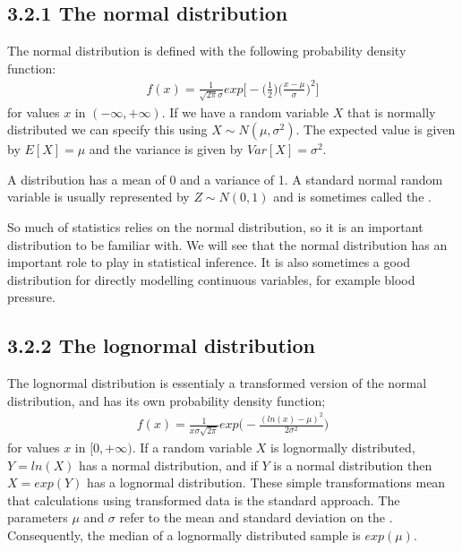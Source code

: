 \documentclass[letterpaper,10pt,english]{jupyterBook}
\begin{document}
\subsection{3.2.1 The normal distribution}
\label{\detokenize{03.c. Continuous Probability Distributions:the-normal-distribution}}
\sphinxAtStartPar
The normal distribution is defined with the following probability density function:
\begin{equation*}
\begin{split}
f(x) = \frac{1}{\sqrt{2\pi}\sigma}exp \Big[-\Big(\frac{1}{2}\Big)\Big(\frac{x-\mu}{\sigma}\Big)^2\Big]
\end{split}
\end{equation*}
\sphinxAtStartPar
for values \(x\) in \((-\infty, +\infty)\). If we have a random variable \(X\) that is normally distributed we can specify this using \(X {\sim} N(\mu, \sigma^2)\). The expected value is given by \(E[X]=\mu\) and the variance is given by \(Var[X] = \sigma^2\).

\sphinxAtStartPar
A  distribution has a mean of 0 and a variance of 1. A standard normal random variable is usually represented by \(Z {\sim} N(0,1)\) and is sometimes called the .

\sphinxAtStartPar
So much of statistics relies on the normal distribution, so it is an important distribution to be familiar with. We will see that the normal distribution has an important role to play in statistical inference. It is also sometimes a good distribution for directly modelling continuous variables, for example blood pressure.


\subsection{3.2.2 The log\sphinxhyphen{}normal distribution}
\label{\detokenize{03.c. Continuous Probability Distributions:the-log-normal-distribution}}
\sphinxAtStartPar
The log\sphinxhyphen{}normal distribution is essentialy a transformed version of the normal distribution, and has its own probability density function;
\begin{equation*}
\begin{split}
f(x) = \frac{1}{x \sigma \sqrt{2\pi}}exp\Big(-\frac{(ln(x)-\mu)^2}{2\sigma^2}\Big)
\end{split}
\end{equation*}
\sphinxAtStartPar
for values \(x\) in  \([0,+\infty)\). If a random variable \(X\) is log\sphinxhyphen{}normally distributed, \(Y=ln(X)\) has a normal distribution, and if \(Y\) is a normal distribution then \(X=exp(Y)\) has a log\sphinxhyphen{}normal distribution. These simple transformations mean that calculations using transformed data is the standard approach. The parameters \(\mu\) and \(\sigma\) refer to the mean and standard deviation on the . Consequently, the median of a log\sphinxhyphen{}normally distributed sample is \(exp(\mu)\).
\end{document}
